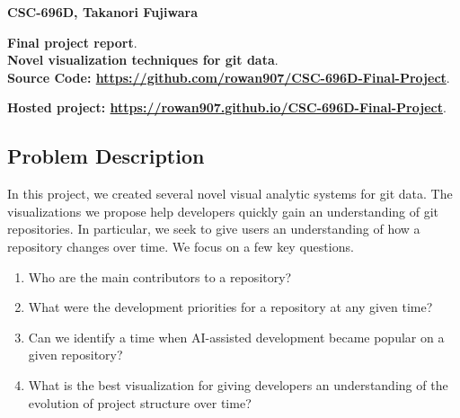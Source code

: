 \documentclass[12 pt]{article}
\begin{document}
\noindent \textbf{CSC-696D, Takanori Fujiwara} \par
\noindent \textbf{Final project report}. \\
\noindent \textbf{Novel visualization techniques for git data}. \\
\noindent \textbf{Source Code:
\href{https://github.com/rowan907/CSC-696D-Final-Project}{https://github.com/rowan907/CSC-696D-Final-Project}}.
\par
\noindent \textbf{Hosted project:
\href{https://rowan907.github.io/CSC-696D-Final-Project}{https://rowan907.github.io/CSC-696D-Final-Project}}.
\bigskip

\subsection{Problem Description}
In this project, we created several novel visual analytic systems for git
data. The visualizations we propose help developers quickly gain an understanding of
git repositories. In particular, we seek to give users an understanding of how a
repository changes over time. We focus on a few key questions.
\begin{enumerate}
    \item Who are the main contributors to a repository?
    \item What were the development priorities for a repository at any given
        time?
    \item Can we identify a time when AI-assisted development became popular on
        a given repository?
    \item What is the best visualization for giving developers an understanding of the
        evolution of project structure over time?
\end{enumerate}
\end{document}
